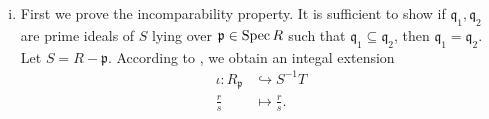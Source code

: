 \begin{prf}
    \begin{enumerate}[(i)]
        \item First we prove the incomparability property. It is sufficient to show if $\mathfrak{q}_1, \mathfrak{q}_2$ are prime ideals of $S$ lying over $\mathfrak{p}\in \operatorname{Spec} R$ such that $\mathfrak{q}_1\subseteq \mathfrak{q}_2$, then $\mathfrak{q}_1=\mathfrak{q}_2$. Let $S=R-\mathfrak{p}$. According to , we obtain an integal extension
        \begin{align*}
            \iota: R_\mathfrak{p}&\hookrightarrow S^{-1}T\\
            \frac{r}{s}&\longmapsto \frac{r}{s}.
        \end{align*}
        

\end{enumerate}
\end{prf}
